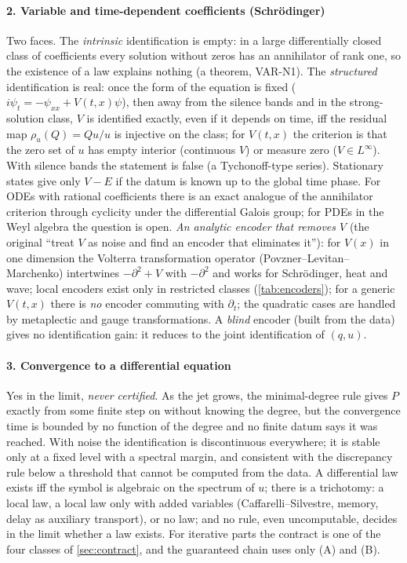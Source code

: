 \paragraph{2. Variable and time-dependent coefficients (Schr\"odinger)} Two faces. The \emph{intrinsic} identification is empty: in a large differentially closed class of coefficients every solution without zeros has an annihilator of rank one, so the existence of a law explains nothing (a theorem, VAR-N1).
The \emph{structured} identification is real: once the form of the equation is fixed ($i\psi_t=-\psi_{xx}+V(t,x)\psi$), then away from the silence bands and in the strong-solution class, $V$ is identified exactly, even if it depends on time, iff the residual map $\rho_u(Q)=Qu/u$ is injective on the class; for $V(t,x)$ the criterion is that the zero set of $u$ has empty interior (continuous $V$) or measure zero ($V\in L^\infty$). With silence bands the statement is false (a Tychonoff-type series). Stationary states give only $V-E$ if the datum is known up to the global time phase.
For ODEs with rational coefficients there is an exact analogue of the annihilator criterion through cyclicity under the differential Galois group; for PDEs in the Weyl algebra the question is open.
\emph{An analytic encoder that removes $V$} (the original ``treat $V$ as noise and find an encoder that eliminates it''): for $V(x)$ in one dimension the Volterra transformation operator (Povzner--Levitan--Marchenko) intertwines $-\partial^2+V$ with $-\partial^2$ and works for Schr\"odinger, heat and wave; local encoders exist only in restricted classes (\cref{tab:encoders}); for a generic $V(t,x)$ there is \emph{no} encoder commuting with $\partial_t$; the quadratic cases are handled by metaplectic and gauge transformations. A \emph{blind} encoder (built from the data) gives no identification gain: it reduces to the joint identification of $(q,u)$.

\paragraph{3. Convergence to a differential equation} Yes in the limit, \emph{never certified}. As the jet grows, the minimal-degree rule gives $P$ exactly from some finite step on without knowing the degree, but the convergence time is bounded by no function of the degree and no finite datum says it was reached.
With noise the identification is discontinuous everywhere; it is stable only at a fixed level with a spectral margin, and consistent with the discrepancy rule below a threshold that cannot be computed from the data. A differential law exists iff the symbol is algebraic on the spectrum of $u$; there is a trichotomy: a local law, a local law only with added variables (Caffarelli--Silvestre, memory, delay as auxiliary transport), or no law; and no rule, even uncomputable, decides in the limit whether a law exists.
For iterative parts the contract is one of the four classes of \cref{sec:contract}, and the guaranteed chain uses only (A) and (B).

